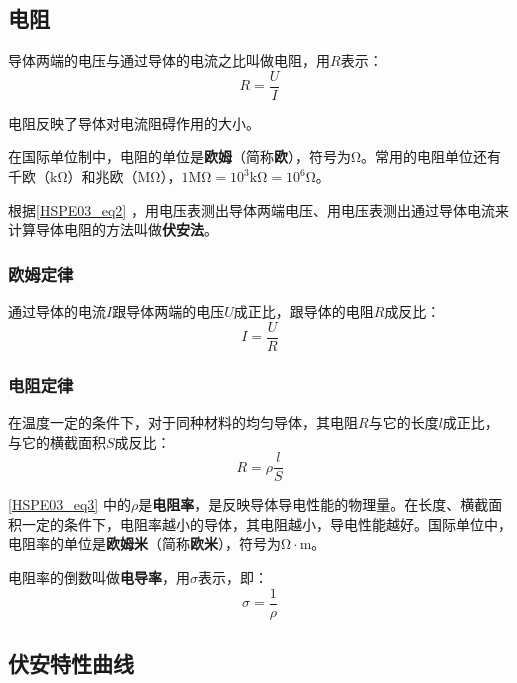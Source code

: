 \subsection{电阻}

导体两端的电压与通过导体的电流之比叫做电阻，用$R$表示：
\begin{equation}\label{HSPE03_eq2}
R=\frac{U}{I}
\end{equation}

电阻反映了导体对电流阻碍作用的大小。

在国际单位制中，电阻的单位是\textbf{欧姆}（简称\textbf{欧}），符号为$\mathrm{\Omega}$。常用的电阻单位还有千欧（$\mathrm{k\Omega}$）和兆欧（$\mathrm{M\Omega}$），$1\mathrm{M\Omega}=10^3\mathrm{k\Omega}=10^6\mathrm{\Omega}$。

根据\autoref{HSPE03_eq2} ，用电压表测出导体两端电压、用电压表测出通过导体电流来计算导体电阻的方法叫做\textbf{伏安法}。

\subsubsection{欧姆定律}

通过导体的电流$I$跟导体两端的电压$U$成正比，跟导体的电阻$R$成反比：
\begin{equation}
I=\frac{U}{R}
\end{equation}

\subsubsection{电阻定律}

在温度一定的条件下，对于同种材料的均匀导体，其电阻$R$与它的长度$l$成正比，与它的横截面积$S$成反比：
\begin{equation}\label{HSPE03_eq3}
R=\rho \frac{l}{S}
\end{equation}

\autoref{HSPE03_eq3} 中的$\rho$是\textbf{电阻率}，是反映导体导电性能的物理量。在长度、横截面积一定的条件下，电阻率越小的导体，其电阻越小，导电性能越好。国际单位中，电阻率的单位是\textbf{欧姆米}（简称\textbf{欧米}），符号为$\mathrm{\Omega\cdot m}$。

电阻率的倒数叫做\textbf{电导率}，用$\sigma$表示，即：
\begin{equation}
\sigma = \frac{1}{\rho}
\end{equation}

\subsection{伏安特性曲线}

